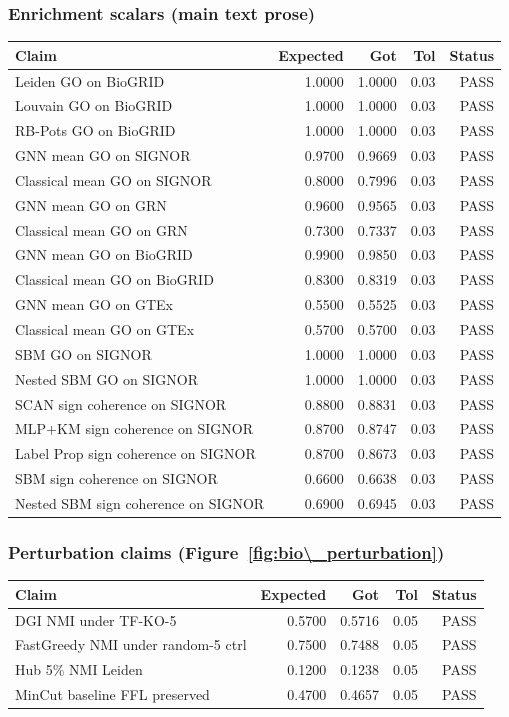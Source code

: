 \subsubsection{Enrichment scalars (main text prose)}
\begin{tabular}{p{7cm}rrrr}
\toprule
Claim & Expected & Got & Tol & Status \\
\midrule
Leiden GO on BioGRID & 1.0000 & 1.0000 & 0.03 & PASS \\
Louvain GO on BioGRID & 1.0000 & 1.0000 & 0.03 & PASS \\
RB-Pots GO on BioGRID & 1.0000 & 1.0000 & 0.03 & PASS \\
GNN mean GO on SIGNOR & 0.9700 & 0.9669 & 0.03 & PASS \\
Classical mean GO on SIGNOR & 0.8000 & 0.7996 & 0.03 & PASS \\
GNN mean GO on GRN & 0.9600 & 0.9565 & 0.03 & PASS \\
Classical mean GO on GRN & 0.7300 & 0.7337 & 0.03 & PASS \\
GNN mean GO on BioGRID & 0.9900 & 0.9850 & 0.03 & PASS \\
Classical mean GO on BioGRID & 0.8300 & 0.8319 & 0.03 & PASS \\
GNN mean GO on GTEx & 0.5500 & 0.5525 & 0.03 & PASS \\
Classical mean GO on GTEx & 0.5700 & 0.5700 & 0.03 & PASS \\
SBM GO on SIGNOR & 1.0000 & 1.0000 & 0.03 & PASS \\
Nested SBM GO on SIGNOR & 1.0000 & 1.0000 & 0.03 & PASS \\
SCAN sign coherence on SIGNOR & 0.8800 & 0.8831 & 0.03 & PASS \\
MLP+KM sign coherence on SIGNOR & 0.8700 & 0.8747 & 0.03 & PASS \\
Label Prop sign coherence on SIGNOR & 0.8700 & 0.8673 & 0.03 & PASS \\
SBM sign coherence on SIGNOR & 0.6600 & 0.6638 & 0.03 & PASS \\
Nested SBM sign coherence on SIGNOR & 0.6900 & 0.6945 & 0.03 & PASS \\
\bottomrule
\end{tabular}
\subsubsection{Perturbation claims (Figure~\ref{fig:bio\_perturbation})}
\begin{tabular}{p{7cm}rrrr}
\toprule
Claim & Expected & Got & Tol & Status \\
\midrule
DGI NMI under TF-KO-5 & 0.5700 & 0.5716 & 0.05 & PASS \\
FastGreedy NMI under random-5 ctrl & 0.7500 & 0.7488 & 0.05 & PASS \\
Hub 5\% NMI Leiden & 0.1200 & 0.1238 & 0.05 & PASS \\
MinCut baseline FFL preserved & 0.4700 & 0.4657 & 0.05 & PASS \\
\bottomrule
\end{tabular}
